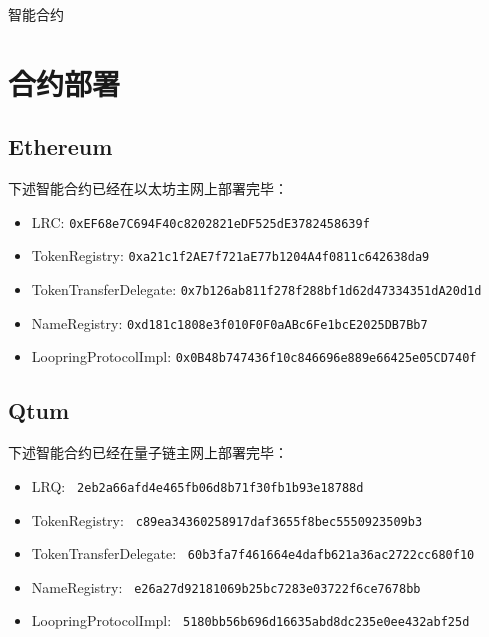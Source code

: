 \documentclass[UTF8]{ctexart}
\makeatletter
\newenvironment{figurehere}
 {\def\@captype{figure}}
 {}
\makeatother
\begin{document}
\begin{appendices}
\begin{center}
\begin{figurehere}
\begin{tikzpicture}
\end{tikzpicture} 
\caption{智能合约}
\label{fig:smartcontracts}
\end{figurehere}
\end{center}

\section{合约部署}

\subsection{Ethereum}
下述智能合约已经在以太坊主网上部署完毕：
\begin{itemize}
\item LRC: \verb|0xEF68e7C694F40c8202821eDF525dE3782458639f|
\item TokenRegistry: \verb|0xa21c1f2AE7f721aE77b1204A4f0811c642638da9|
\item TokenTransferDelegate: \verb|0x7b126ab811f278f288bf1d62d47334351dA20d1d|
\item NameRegistry: \verb|0xd181c1808e3f010F0F0aABc6Fe1bcE2025DB7Bb7|
\item LoopringProtocolImpl: \verb|0x0B48b747436f10c846696e889e66425e05CD740f|
\end{itemize}

\subsection{Qtum}
下述智能合约已经在量子链主网上部署完毕：
\begin{itemize}
\item LRQ: \verb| 2eb2a66afd4e465fb06d8b71f30fb1b93e18788d |
\item TokenRegistry: \verb| c89ea34360258917daf3655f8bec5550923509b3 |
\item TokenTransferDelegate: \verb| 60b3fa7f461664e4dafb621a36ac2722cc680f10 |
\item NameRegistry: \verb| e26a27d92181069b25bc7283e03722f6ce7678bb |
\item LoopringProtocolImpl: \verb| 5180bb56b696d16635abd8dc235e0ee432abf25d |
\end{itemize}

\end{appendices}
\end{document}
